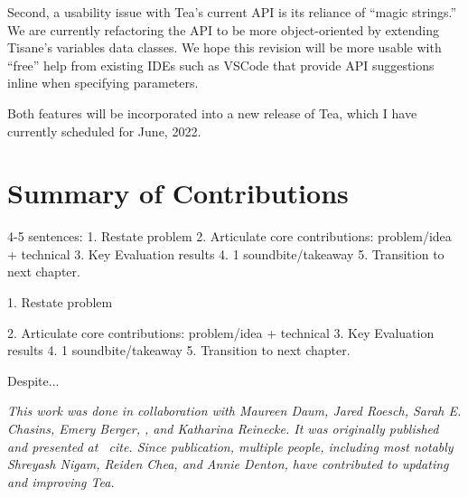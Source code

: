 Second, a usability issue with Tea's current API is its reliance of ``magic
strings.'' We are currently refactoring the API to be more object-oriented by
extending Tisane's variables data classes. We hope this revision will be more
usable with ``free'' help from existing IDEs such as VSCode that provide API
suggestions inline when specifying parameters. 

Both features will be incorporated into a new release of Tea, which I have
currently scheduled for June, 2022. 

\section{Summary of Contributions}
4-5 sentences: 
1. Restate problem 
2. Articulate core contributions: problem/idea + technical
3. Key Evaluation results
4. 1 soundbite/takeaway
5. Transition to next chapter. 

1. Restate problem 

2. Articulate core contributions: problem/idea + technical
3. Key Evaluation results
4. 1 soundbite/takeaway
5. Transition to next chapter. 

Despite...


\textit{This work was done in collaboration with Maureen Daum, Jared Roesch, Sarah E.
Chasins, Emery Berger, \reneJust, and Katharina Reinecke. It was originally
published and presented at ~cite{}. Since publication, multiple
people, including most notably Shreyash Nigam, Reiden Chea, and Annie Denton,
have contributed to updating and improving Tea.}
